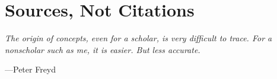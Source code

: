 \section{Sources, Not Citations}

\begin{displayquote}
	\textit{The origin of concepts, even for a scholar, is very difficult to trace. For a nonscholar such as me, it is easier. But less accurate.}
	\begin{flushright}
		---Peter Freyd
	\end{flushright}
	\vspace{4mm}
\end{displayquote}




%




